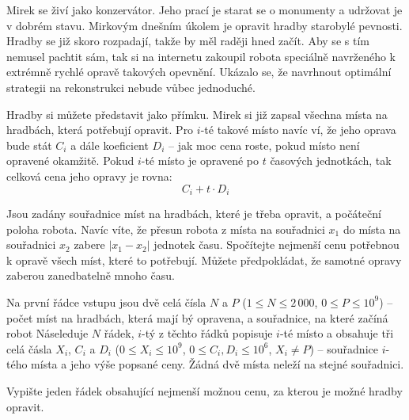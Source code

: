 





Mirek se živí jako konzervátor.
Jeho prací je starat se o monumenty a udržovat je v dobrém stavu.
Mirkovým dnešním úkolem je opravit hradby starobylé pevnosti.
Hradby se již skoro rozpadají, takže by měl raději hned začít.
Aby se s tím nemusel pachtit sám, tak si na internetu zakoupil robota
speciálně navrženého k extrémně rychlé opravě takových opevnění.
Ukázalo se, že navrhnout optimální strategii na rekonstrukci nebude vůbec jednoduché.

Hradby si můžete představit jako přímku.
Mirek si již zapsal všechna místa na hradbách, která potřebují opravit.
Pro $i$-té takové místo navíc ví, že jeho oprava bude stát $C_i$
a dále koeficient $D_i$ -- jak moc cena roste, pokud místo není opravené okamžitě.
Pokud $i$-té místo je opravené po $t$ časových jednotkách,
tak celková cena jeho opravy je rovna:
\[ C_i + t \cdot D_i \]


Jsou zadány souřadnice míst na hradbách, které je třeba opravit,
a počáteční poloha robota.
  Navíc víte, že přesun robota z místa na souřadnici $x_1$ do místa na souřadnici $x_2$
zabere $|x_1 - x_2|$ jednotek času.
Spočítejte nejmenší cenu potřebnou k opravě všech míst, které to potřebují.
Můžete předpokládat, že samotné opravy zaberou zanedbatelně mnoho času.


Na první řádce vstupu jsou dvě celá čísla $N$ a $P$
($1 \le N \le 2\,000$, $0 \le P \le 10^9$)
-- počet míst na hradbách, která mají bý opravena, a souřadnice,
na které začíná robot
Náseleduje $N$ řádek, $i$-tý z těchto řádků popisuje $i$-té místo
a obsahuje tři celá čásla $X_i$, $C_i$ a $D_i$
($0 \le X_i \le 10^9$, $0 \le C_i, D_i \le 10^6$, $X_i \neq P$)
-- souřadnice $i$-tého místa a jeho výše popsané ceny.
Žádná dvě místa neleží na stejné souřadnici.


Vypište jeden řádek obsahující nejmenší možnou cenu,
za kterou je možné hradby opravit.



